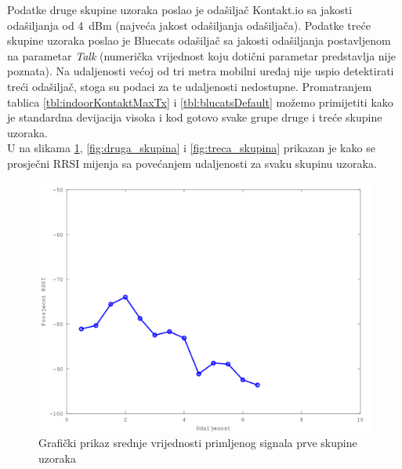 Podatke druge skupine uzoraka poslao je odašiljač Kontakt.io sa jakosti odašiljanja od \SI{4}{dBm} (najveća jakost odašiljanja odašiljača). 
Podatke treće skupine uzoraka poslao je Bluecats odašiljač sa jakosti odašiljanja postavljenom na parametar \textit{Talk} (numerička vrijednost koju dotični parametar predstavlja nije poznata). 
Na udaljenosti većoj od tri metra mobilni uređaj nije uspio detektirati treći odašiljač, stoga su podaci za te udaljenosti nedostupne. 
Promatranjem tablica \ref{tbl:indoorKontaktMaxTx} i \ref{tbl:blucatsDefault} možemo primijetiti kako je standardna devijacija visoka i kod gotovo svake grupe druge i treće skupine uzoraka.
\\
U na slikama \ref{fig:prva_skupina}, \ref{fig:druga_skupina} i \ref{fig:treca_skupina} prikazan je kako se prosječni RRSI mijenja sa povećanjem udaljenosti za svaku skupinu uzoraka.

\begin{figure}[H]
    \centering
    \includegraphics[scale=0.62]{pictures/prva-skupina-uzoraka}
    \caption{Grafički prikaz srednje vrijednosti primljenog signala prve skupine uzoraka}
    \label{fig:prva_skupina}
\end{figure}


